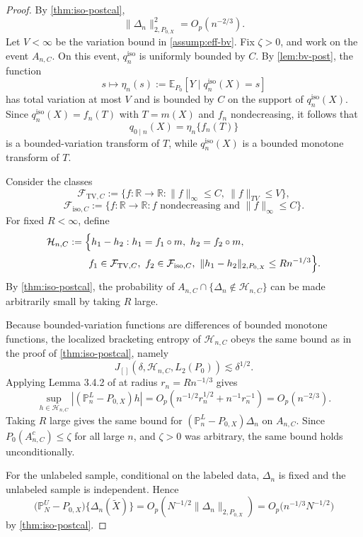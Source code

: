 \documentclass{article}
\theoremstyle{plain}
\theoremstyle{definition}
\newcommand{\E}{\mathbb{E}}
\newcommand{\R}{\mathbb{R}}
\newcommand{\1}{\mathbf{1}}
\newcommand{\mhat}{m}
\newcommand{\Pl}{\mathbb{P}^{L}_n}
\newcommand{\Pu}{\mathbb{P}^{U}_N}
\newcommand{\Px}{P_{0,X}}
\begin{document}
\begin{proof}
By \cref{thm:iso-postcal},
\[
\|\Delta_n\|_{2,\Px}^2=O_p(n^{-2/3}).
\]
Let \(V<\infty\) be the variation bound in \cref{assump:eff-bv}. Fix \(\zeta>0\), and work on the event \(A_{n,C}\). On this event, \(q_n^{\mathrm{iso}}\) is uniformly bounded by \(C\). By \cref{lem:bv-post}, the function
\[
s\mapsto \eta_n(s):=\E_{P_0}[Y\mid q_n^{\mathrm{iso}}(X)=s]
\]
has total variation at most \(V\) and is bounded by \(C\) on the support of \(q_n^{\mathrm{iso}}(X)\). Since \(q_n^{\mathrm{iso}}(X)=f_n(T)\) with \(T=\mhat(X)\) and \(f_n\) nondecreasing, it follows that
\[
q_{0\mid n}(X)=\eta_n\{f_n(T)\}
\]
is a bounded-variation transform of \(T\), while \(q_n^{\mathrm{iso}}(X)\) is a bounded monotone transform of \(T\).

Consider the classes
\[
\mathcal F_{\mathrm{TV},C}
:=
\{f:\R\to\R:\|f\|_\infty\le C,\ \|f\|_{TV}\le V\},
\]
\[
\mathcal F_{\mathrm{iso},C}
:=
\{f:\R\to\R:\text{$f$ nondecreasing and }\|f\|_\infty\le C\}.
\]
For fixed \(R<\infty\), define
\[\begin{aligned}
\mathcal H_{n,C}
&:=
\Bigl\{
h_1-h_2:
h_1=f_1\circ\mhat,\ h_2=f_2\circ\mhat,\\
&\qquad f_1\in\mathcal F_{\mathrm{TV},C},\
f_2\in\mathcal F_{\mathrm{iso},C},\
\|h_1-h_2\|_{2,\Px}\le Rn^{-1/3}
\Bigr\}.
\end{aligned}\]
By \cref{thm:iso-postcal}, the probability of \(A_{n,C}\cap\{\Delta_n\notin\mathcal H_{n,C}\}\) can be made arbitrarily small by taking \(R\) large.

Because bounded-variation functions are differences of bounded monotone functions, the localized bracketing entropy of \(\mathcal H_{n,C}\) obeys the same bound as in the proof of \cref{thm:iso-postcal}, namely
\[
J_{[]}(\delta,\mathcal H_{n,C},L_2(P_0))\lesssim \delta^{1/2}.
\]
Applying Lemma 3.4.2 of \citet{vdvwellner1996} at radius \(r_n=Rn^{-1/3}\) gives
\[
\sup_{h\in\mathcal H_{n,C}}|(\Pl-\Px)h|
=O_p\!\left(n^{-1/2}r_n^{1/2}+n^{-1}r_n^{-1}\right)
=O_p(n^{-2/3}).
\]
Taking \(R\) large gives the same bound for \((\Pl-\Px)\Delta_n\) on \(A_{n,C}\).
Since \(P_0(A_{n,C}^c)\le \zeta\) for all large \(n\), and \(\zeta>0\) was arbitrary, the same bound holds unconditionally.

For the unlabeled sample, conditional on the labeled data, \(\Delta_n\) is fixed and the unlabeled sample is independent. Hence
\[
\bigl(\Pu-\Px\bigr)\{\Delta_n(\widetilde X)\}
=
O_p\left(N^{-1/2}\|\Delta_n\|_{2,\Px}\right)
=
O_p\bigl(n^{-1/3}N^{-1/2}\bigr)
\]
by \cref{thm:iso-postcal}.
\end{proof}
\end{document}
